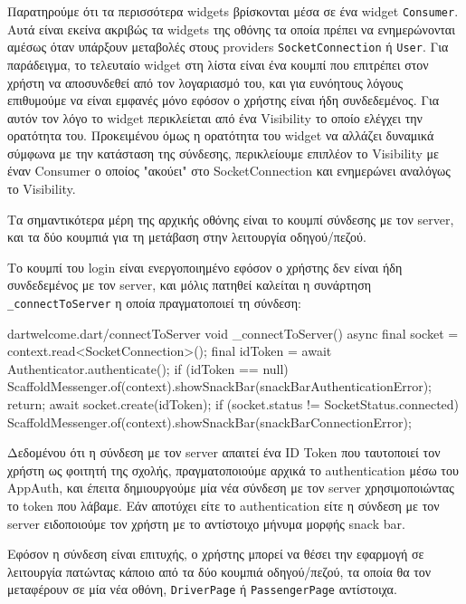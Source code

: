 \documentclass[../thesis.tex]{subfiles}
\begin{document}
Παρατηρούμε ότι τα περισσότερα widgets βρίσκονται μέσα σε ένα widget \verb|Consumer|.
Αυτά είναι εκείνα ακριβώς τα widgets της οθόνης τα οποία πρέπει να ενημερώνονται αμέσως όταν υπάρξουν μεταβολές στους providers \verb|SocketConnection| ή \verb|User|.
Για παράδειγμα, το τελευταίο widget στη λίστα είναι ένα κουμπί που επιτρέπει στον χρήστη να αποσυνδεθεί από τον λογαριασμό του, και για ευνόητους λόγους επιθυμούμε να είναι εμφανές μόνο εφόσον ο χρήστης είναι ήδη συνδεδεμένος.
Για αυτόν τον λόγο το widget περικλείεται από ένα Visibility το οποίο ελέγχει την ορατότητα του.
Προκειμένου όμως η ορατότητα του widget να αλλάζει δυναμικά σύμφωνα με την κατάσταση της σύνδεσης, περικλείουμε επιπλέον το Visibility με έναν Consumer ο οποίος "ακούει" στο SocketConnection και ενημερώνει αναλόγως το Visibility.

Τα σημαντικότερα μέρη της αρχικής οθόνης είναι το κουμπί σύνδεσης με τον server, και τα δύο κουμπιά για τη μετάβαση στην λειτουργία οδηγού/πεζού.

Το κουμπί του login είναι ενεργοποιημένο εφόσον ο χρήστης δεν είναι ήδη συνδεδεμένος με τον server, και μόλις πατηθεί καλείται η συνάρτηση \verb|_connectToServer| η οποία πραγματοποιεί τη σύνδεση:

\begin{codeblock}{dart}{welcome.dart/connectToServer}
  void _connectToServer() async {
    final socket = context.read<SocketConnection>();
    final idToken = await Authenticator.authenticate();
    if (idToken == null) {
      ScaffoldMessenger.of(context).showSnackBar(snackBarAuthenticationError);
      return;
    }
    await socket.create(idToken);
    if (socket.status != SocketStatus.connected) {
      ScaffoldMessenger.of(context).showSnackBar(snackBarConnectionError);
    }
  }
\end{codeblock}

Δεδομένου ότι η σύνδεση με τον server απαιτεί ένα ID Token που ταυτοποιεί τον χρήστη ως φοιτητή της σχολής, πραγματοποιούμε αρχικά το authentication μέσω του AppAuth, και έπειτα δημιουργούμε μία νέα σύνδεση με τον server χρησιμοποιώντας το token που λάβαμε.
Εάν αποτύχει είτε το authentication είτε η σύνδεση με τον server ειδοποιούμε τον χρήστη με το αντίστοιχο μήνυμα μορφής snack bar.

Εφόσον η σύνδεση είναι επιτυχής, ο χρήστης μπορεί να θέσει την εφαρμογή σε λειτουργία πατώντας κάποιο από τα δύο κουμπιά οδηγού/πεζού, τα οποία θα τον μεταφέρουν σε μία νέα οθόνη, \verb|DriverPage| ή \verb|PassengerPage| αντίστοιχα.
\end{document}
